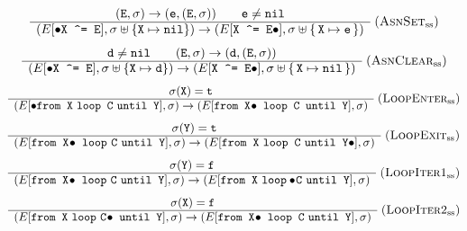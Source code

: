 \documentclass[border=6pt,varwidth=15cm]{standalone}
\begin{document}
\[
\begin{array}{c}
(\t{E},\sigma) \to (\t{e}, (\t{E},\sigma)) \qquad \t{e}\neq\t{nil}\\
\hline
 (E[\bullet\t{X \char`^= E}],\sigma\uplus \{\t{X}\mapsto \t{nil}\}) \to
 (E[\t{X \char`^= E}\bullet],\sigma\uplus \{\,\t{X}\mapsto \t{e}\,\})
\end{array}~(\textsc{AsnSet}_\mathrm{ss})
\]
\[
\begin{array}{c}
\t{d}\neq\t{nil} \qquad (\t{E},\sigma) \to (\t{d}, (\t{E},\sigma))\\
\hline
 (E[\bullet\t{X \char`^= E}],\sigma\uplus \{\t{X}\mapsto \t{d}\}) \to
 (E[\t{X \char`^= E}\bullet],\sigma\uplus \{\,\t{X}\mapsto \t{nil}\,\})
\end{array}~(\textsc{AsnClear}_\mathrm{ss})
\]
\[
\begin{array}{c}
\sigma(\texttt{X}) = \texttt{t}\\
\hline
 (E[\bullet\texttt{from X} ~ \texttt{loop C} ~ \texttt{until Y}],\sigma) \to
 (E[\texttt{from X}\!\bullet~\texttt{loop C until Y}],\sigma)
\end{array}~\textsc{(LoopEnter$_\mathrm{ss}$)}
\]%
\[
\begin{array}{c}
\sigma(\texttt{Y}) = \texttt{t}\\
\hline
 (E[\texttt{from X}\!\bullet ~\texttt{loop}~\texttt{C} ~ \texttt{until Y}],\sigma) \to
 (E[\texttt{from X} ~ \texttt{loop C} ~ \texttt{until Y}\bullet],\sigma)
\end{array}~\textsc{(LoopExit$_\mathrm{ss}$)}
\]
\[
\begin{array}{c}
\sigma(\texttt{Y}) = \texttt{f}\\
\hline
 (E[\texttt{from X}\!\bullet ~\texttt{loop}~\texttt{C} ~ \texttt{until Y}],\sigma) \to
 (E[\texttt{from X} ~ \texttt{loop}\bullet\!\texttt{C} ~ \texttt{until Y}],\sigma)
\end{array}~\textsc{(LoopIter1$_\mathrm{ss}$)}
\]
\[
\begin{array}{c}
\sigma(\texttt{X}) = \texttt{f}\\
\hline
 (E[\texttt{from X} ~\texttt{loop}~\texttt{C}\!\bullet ~ \texttt{until Y}],\sigma) \to
 (E[\texttt{from X}\!\bullet ~ \texttt{loop C} ~ \texttt{until Y}],\sigma)
\end{array}~\textsc{(LoopIter2$_\mathrm{ss}$)}
\]
\end{document}
